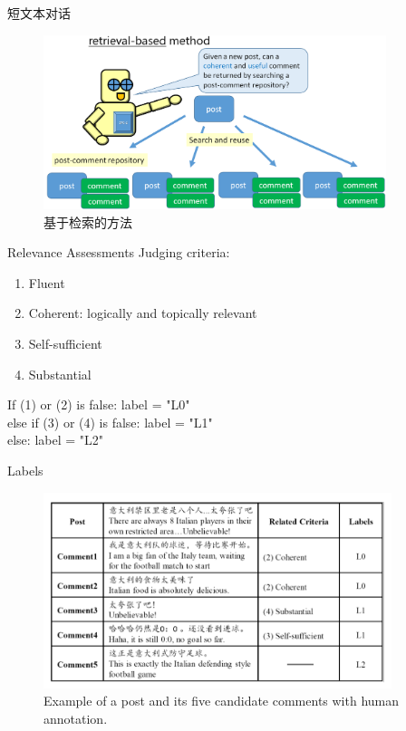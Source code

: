 \documentclass[aspectratio=169]{beamer} %
\begin{document}
    \begin{frame}{短文本对话}
      
      \begin{figure}
      \includegraphics[width=10cm,height=5.09cm]{stc2-ir-task.png}
      \caption{基于检索的方法}
      \end{figure}

    \end{frame}

    \begin{frame}{Relevance Assessments}
      Judging criteria:
      \begin{enumerate}
        \item Fluent
        \item Coherent: logically and topically relevant 
        \item Self-sufficient
        \item Substantial
      \end{enumerate}
      If (1) or (2) is false: label = "L0" \\
      else if (3) or (4) is false: label = "L1" \\
      else: label = "L2"
    \end{frame}

    \begin{frame}{Labels}
      \begin{center}
        \begin{figure}
        \includegraphics[width=4in,height=2.25in]{stc-labels.png}
        \caption{Example of a post and its five candidate comments with human annotation. }
        \end{figure}
      \end{center}
    \end{frame}
\end{document}
